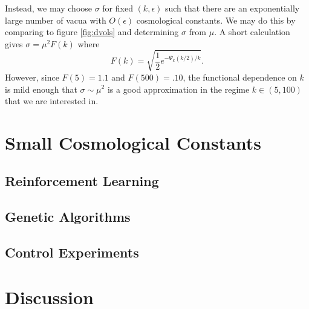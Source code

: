 \documentclass[a4paper,11pt]{article}
\begin{document}
Instead, we may choose $\sigma$ for fixed $(k,\epsilon)$ such that
there are an exponentially large number of vacua with $O(\epsilon)$
cosmological constants. We may do this by comparing to figure \ref{fig:dvols}
and determining $\sigma$ from $\mu$. A short calculation gives $\sigma = \mu^2 F(k)$ where
\begin{equation}
F(k)=\sqrt{\frac12 e^{-\Psi_k(k/2)/k}}.
\end{equation}
However, since $F(5)=1.1$ and  $F(500)=.10$, the functional
dependence on $k$ is mild enough that $\sigma \sim \mu^2$ 
is a good approximation in the regime $k\in (5,100)$ that
we are interested in.




\section{Small Cosmological Constants}
\subsection{Reinforcement Learning}
\subsection{Genetic Algorithms}
\subsection{Control Experiments}

\section{Discussion}



\end{document}

